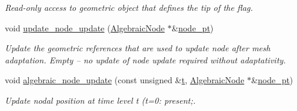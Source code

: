 \begin{DoxyCompactItemize}
\begin{DoxyCompactList}\small\item\em Read-\/only access to geometric object that defines the tip of the flag. \end{DoxyCompactList}\item 
void \hyperlink{classoomph_1_1AlgebraicCylinderWithFlagMesh_a9d909de1db84a3b7e42494535b152d92}{update\+\_\+node\+\_\+update} (\hyperlink{classoomph_1_1AlgebraicNode}{Algebraic\+Node} $\ast$\&\hyperlink{classoomph_1_1AlgebraicMesh_aedeebbe95d2f8e67e9939cecd1be3933}{node\+\_\+pt})
\begin{DoxyCompactList}\small\item\em Update the geometric references that are used to update node after mesh adaptation. Empty -- no update of node update required without adaptativity. \end{DoxyCompactList}\item 
void \hyperlink{classoomph_1_1AlgebraicCylinderWithFlagMesh_a5e1e770e82577e5702470d8b87f8599d}{algebraic\+\_\+node\+\_\+update} (const unsigned \&\hyperlink{cfortran_8h_af6f0bd3dc13317f895c91323c25c2b8f}{t}, \hyperlink{classoomph_1_1AlgebraicNode}{Algebraic\+Node} $\ast$\&\hyperlink{classoomph_1_1AlgebraicMesh_aedeebbe95d2f8e67e9939cecd1be3933}{node\+\_\+pt})
\begin{DoxyCompactList}\small\item\em Update nodal position at time level t (t=0\+: present;. \end{DoxyCompactList}\end{DoxyCompactItemize}
